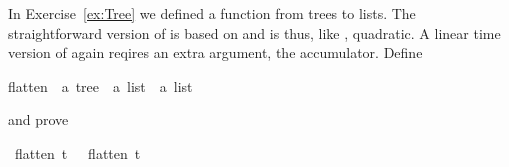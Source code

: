 %
\begin{isabellebody}%
\def\isabellecontext{Tree{\isadigit{2}}}%
%
\isadelimtheory
%
\endisadelimtheory
%
\isatagtheory
%
\endisatagtheory
{\isafoldtheory}%
%
\isadelimtheory
%
\endisadelimtheory
%
\begin{isamarkuptext}%
\noindent In Exercise~\ref{ex:Tree} we defined a function
 from trees to lists. The straightforward version of
 is based on \isa{{\isacharat}} and is thus, like ,
quadratic. A linear time version of  again reqires an extra
argument, the accumulator. Define%
\end{isamarkuptext}%
\isamarkuptrue%
flatten{}\ {\isacharcolon}{\isacharcolon}\ {\isachardoublequoteopen}{\isacharprime}a\ tree\ {\isasymRightarrow}\ {\isacharprime}a\ list\ {\isasymRightarrow}\ {\isacharprime}a\ list{\isachardoublequoteclose}%
\begin{isamarkuptext}%
\noindent and prove%
\end{isamarkuptext}%
\isamarkuptrue%
%
\isadelimproof
%
\endisadelimproof
%
\isatagproof
%
\endisatagproof
{\isafoldproof}%
%
\isadelimproof
%
\endisadelimproof
{}\isamarkupfalse%
\ {\isachardoublequoteopen}flatten{}\ t\ {\isacharbrackleft}{\isacharbrackright}\ {\isacharequal}\ flatten\ t{\isachardoublequoteclose}%
\isadelimproof
%
\endisadelimproof
%
\isatagproof
%
\endisatagproof
{\isafoldproof}%
%
\isadelimproof
%
\endisadelimproof
%
\isadelimtheory
%
\endisadelimtheory
%
\isatagtheory
%
\endisatagtheory
{\isafoldtheory}%
%
\isadelimtheory
%
\endisadelimtheory
\end{isabellebody}%
